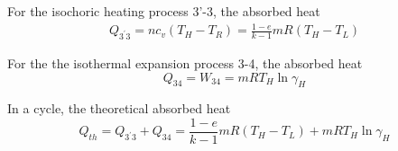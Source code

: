 For the isochoric heating process 3'-3, the absorbed heat
\begin{equation}
	\begin{split}
		Q_{3^{'}3} = nc_v(T_H-T_R)
		=\frac{1-e}{k-1}mR(T_H-T_L)
	\end{split}
\end{equation}


For the the isothermal expansion process 3-4, the absorbed heat
\begin{equation}
	Q_{34} = W_{34} = mRT_H\ln\gamma_H
\end{equation}

In a cycle, the theoretical absorbed heat
\begin{equation}
	Q_{th} = Q_{3^{'}3} + Q_{34} = \frac{1-e}{k-1}mR(T_H-T_L) + mRT_H\ln\gamma_H
\end{equation}


%
%

%
%
%

